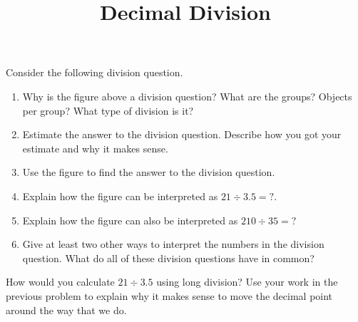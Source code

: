 \documentclass{ximera}
\title{Decimal Division}
\begin{document}
\begin{abstract} \end{abstract}
\maketitle


\begin{problem} Consider the following division question.
\begin{image}
\end{image}
\begin{enumerate}
\item Why is the figure above a division question? What are the groups? Objects per group? What type of division is it? 
\item Estimate the answer to the division question. Describe how you got your estimate and why it makes sense.
\item Use the figure to find the answer to the division question.
\item Explain how the figure can be interpreted as $21 \div 3.5 = ?$.
\item Explain how the figure can also be interpreted as $210 \div 35 = ?$
\item Give at least two other ways to interpret the numbers in the division question. What do all of these division questions have in common?
\end{enumerate}

\end{problem}

\begin{problem}
How would you calculate $21 \div 3.5$ using long division? Use your work in the previous problem to explain why it makes sense to move the decimal point around the way that we do.
\end{problem}
\end{document}

